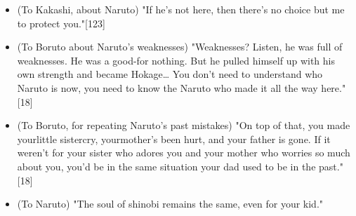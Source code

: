 \documentclass[a4paper,12pt]{article}
\begin{document}
\begin{itemize}
\item (To Kakashi, about Naruto) "If he's not here, then there's no choice but me to protect you."[123]
\item (To Boruto about Naruto's weaknesses) "Weaknesses? Listen, he was full of weaknesses. He was a good-for nothing. But he pulled himself up with his own strength and became Hokage… You don't need to understand who Naruto is now, you need to know the Naruto who made it all the way here."[18]
\item (To Boruto, for repeating Naruto's past mistakes) "On top of that, you made yourlittle sistercry, yourmother's been hurt, and your father is gone. If it weren't for your sister who adores you and your mother who worries so much about you, you'd be in the same situation your dad used to be in the past."[18]
\item (To Naruto) "The soul of shinobi remains the same, even for your kid."
\end{itemize}\\ \par \vspace{0.5cm}
\end{document}
